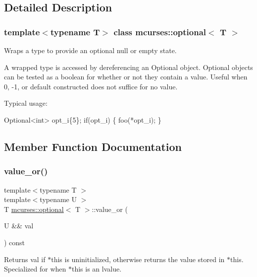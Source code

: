 \subsection{Detailed Description}
\subsubsection*{template$<$typename T$>$\newline
class mcurses\+::optional$<$ T $>$}

Wraps a type to provide an optional \textquotesingle{}null\textquotesingle{} or empty state. 

A wrapped type is accessed by dereferencing an Optional object. Optional objects can be tested as a boolean for whether or not they contain a value. Useful when 0, -\/1, or default constructed does not suffice for \textquotesingle{}no value\textquotesingle{}.

Typical usage\+: 
\begin{DoxyCode}
Optional<int> opt\_i\{5\};
\textcolor{keywordflow}{if}(opt\_i) \{
    foo(*opt\_i);
\}
\end{DoxyCode}
 

\subsection{Member Function Documentation}
\hypertarget{classmcurses_1_1optional_af11e22540ba65265838f589da4bca775}{}\label{classmcurses_1_1optional_af11e22540ba65265838f589da4bca775} 
\subsubsection{\texorpdfstring{value\+\_\+or()}{value\_or()}\hspace{0.1cm}{\footnotesize\ttfamily [1/2]}}
{\footnotesize\ttfamily template$<$typename T $>$ \\
template$<$typename U $>$ \\
T \hyperlink{classmcurses_1_1optional}{mcurses\+::optional}$<$ T $>$\+::value\+\_\+or (\begin{DoxyParamCaption}\item[{U \&\&}]{val }\end{DoxyParamCaption}) const}

Returns val if $\ast$this is uninitialized, otherwise returns the value stored in $\ast$this. Specialized for when $\ast$this is an lvalue.


